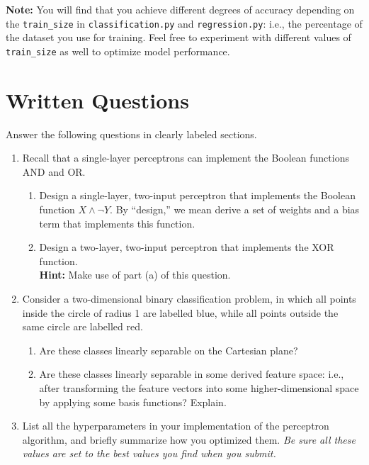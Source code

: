 \documentclass{article}
\begin{document}
\textbf{Note:} You will find that you achieve different degrees of accuracy
depending on the \verb|train_size| in \verb|classification.py| and \verb|regression.py|:
i.e., the percentage of the dataset you use for training.
Feel free to experiment with different values of \verb|train_size| as well to optimize model performance.

\section{Written Questions}
Answer the following questions in clearly labeled sections.

\begin{enumerate}
\item Recall that a single-layer perceptrons can implement the Boolean functions AND and OR.

\begin{enumerate}
\item Design a single-layer, two-input perceptron that implements the Boolean function $X \wedge \neg Y$.
  By ``design,'' we mean derive a set of weights and a bias term that implements this function.
  
\item Design a two-layer, two-input perceptron that implements the XOR function. \\
  \textbf{Hint:} Make use of part (a) of this question.
\end{enumerate}

\item Consider a two-dimensional binary classification problem,
  in which all points inside the circle of radius 1 are labelled blue,
  while all points outside the same circle are labelled red.


\begin{enumerate}
\item Are these classes linearly separable on the Cartesian plane?

\item Are these classes linearly separable in some derived feature space:
  i.e., after transforming the feature vectors into some higher-dimensional space by applying some basis functions?
  Explain.
\end{enumerate}

\item List all the hyperparameters in your implementation of the perceptron algorithm,
  and briefly summarize how you optimized them.
  \emph{Be sure all these values are set to the best values you find when you submit.}
\end{enumerate}
\end{document}
